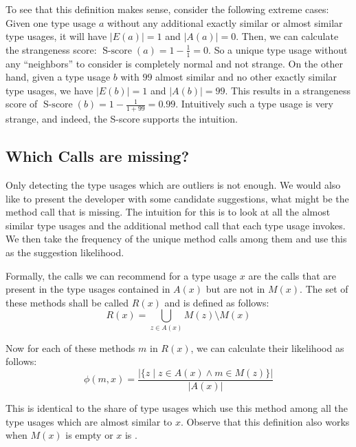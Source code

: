 To see that this definition makes sense, consider the following extreme cases:
Given one type usage $a$ without any additional exactly similar or almost similar type usages, it will have $|E(a)| = 1$ and $|A(a)| = 0$.
Then, we can calculate the strangeness score: $\operatorname{S-score}(a) = 1-\frac{1}{1} = 0$.
So a unique type usage without any ``neighbors'' to consider is completely normal and not strange.
On the other hand, given a type usage $b$ with $99$ almost similar and no other exactly similar type usages, we have $|E(b)| = 1$ and $|A(b)| = 99$.
This results in a strangeness score of $\operatorname{S-score}(b) = 1-\frac{1}{1+99} = 0.99$.
Intuitively such a type usage is very strange, and indeed, the S-score supports the intuition.

\subsection{Which Calls are missing?}

Only detecting the type usages which are outliers is not enough.
We would also like to present the developer with some candidate suggestions, what might be the method call that is missing.
The intuition for this is to look at all the almost similar type usages and the additional method call that each type usage invokes.
We then take the frequency of the unique method calls among them and use this as the suggestion likelihood.

Formally, the calls we can recommend for a type usage $x$ are the calls that are present in the type usages contained in $A(x)$ but are not in $M(x)$.
The set of these methods shall be called $R(x)$ and is defined as follows:
\begin{equation*}
    R(x) = \bigcup_{z \in A(x)} M(z) \setminus M(x)
\end{equation*}

Now for each of these methods $m$ in $R(x)$, we can calculate their likelihood as follows:
\begin{equation*}
    \phi(m, x) = \frac{|\{z \mid z \in A(x) \land m \in M(z)\}|}{|A(x)|}
\end{equation*}

This is identical to the share of type usages which use this method among all the type usages which are almost similar to $x$.
Observe that this definition also works when $M(x)$ is empty or $x$ is .

